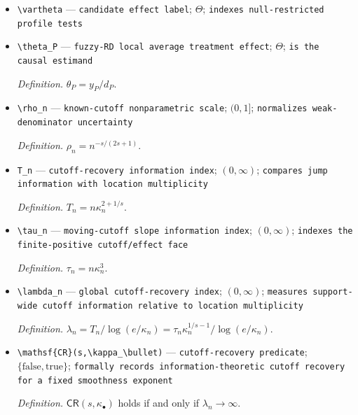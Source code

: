 \documentclass{article}
\begin{document}
\begin{itemize}
  \par\smallskip\noindent\emph{Definition.} \(\Theta=[-1,1]\).
  \item \texttt{\textbackslash{}\allowbreak{}vartheta} --- \texttt{candidate effect label}; \(\Theta\); \texttt{indexes null-\allowbreak{}restricted profile tests}
  \item \texttt{\textbackslash{}\allowbreak{}theta\_\allowbreak{}P} --- \texttt{fuzzy-\allowbreak{}RD local average treatment effect}; \(\Theta\); \texttt{is the causal estimand}
  \par\smallskip\noindent\emph{Definition.} \(\theta_P=y_P/d_P\).
  \item \texttt{\textbackslash{}\allowbreak{}rho\_\allowbreak{}n} --- \texttt{known-\allowbreak{}cutoff nonparametric scale}; \((0,1]\); \texttt{normalizes weak-\allowbreak{}denominator uncertainty}
  \par\smallskip\noindent\emph{Definition.} \(\rho_n=n^{-s/(2s+1)}\).
  \item \texttt{T\_\allowbreak{}n} --- \texttt{cutoff-\allowbreak{}recovery information index}; \((0,\infty)\); \texttt{compares jump information with location multiplicity}
  \par\smallskip\noindent\emph{Definition.} \(T_n=n\kappa_n^{2+1/s}\).
  \item \texttt{\textbackslash{}\allowbreak{}tau\_\allowbreak{}n} --- \texttt{moving-\allowbreak{}cutoff slope information index}; \((0,\infty)\); \texttt{indexes the finite-\allowbreak{}positive cutoff/\allowbreak{}effect face}
  \par\smallskip\noindent\emph{Definition.} \(\tau_n=n\kappa_n^3\).
  \item \texttt{\textbackslash{}\allowbreak{}lambda\_\allowbreak{}n} --- \texttt{global cutoff-\allowbreak{}recovery index}; \((0,\infty)\); \texttt{measures support-\allowbreak{}wide cutoff information relative to location multiplicity}
  \par\smallskip\noindent\emph{Definition.} \(\lambda_n=T_n/\log(e/\kappa_n)=\tau_n\kappa_n^{1/s-1}/\log(e/\kappa_n)\).
  \item \texttt{\textbackslash{}\allowbreak{}mathsf\{CR\}\allowbreak{}(s,\allowbreak{}\textbackslash{}\allowbreak{}kappa\_\allowbreak{}\textbackslash{}\allowbreak{}bullet)} --- \texttt{cutoff-\allowbreak{}recovery predicate}; \(\{\mathrm{false},\mathrm{true}\}\); \texttt{formally records information-\allowbreak{}theoretic cutoff recovery for a fixed smoothness exponent}
  \par\smallskip\noindent\emph{Definition.} \(\mathsf{CR}(s,\kappa_\bullet)\) holds if and only if \(\lambda_n\to\infty\).

\end{itemize}
\end{document}
